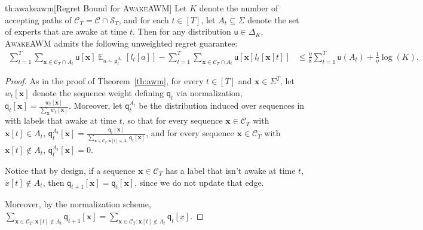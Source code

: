 \documentclass{article}
\DeclareMathOperator*{\E}{\mathbb E}
\newcommand{\sC}{\mathscr C}
\newcommand{\sS}{\mathscr S}
\newcommand{\bx}{{\mathbf x}}
\newcommand{\sfp}{{\mathsf p}}
\newcommand{\sfq}{{\mathsf q}}
\newcommand{\sfu}{{\mathsf u}}
\begin{document}
\begin{reptheorem}{th:awakeawm}[Regret Bound for \textsc{AwakeAWM}]
  Let $K$ denote the number of accepting paths of $\sC_T = \sC \cap \sS_T$,
  and for each $t \in [T]$, let $A_t\subseteq \Sigma$ denote the set of experts 
  that are awake at time $t$.
  Then for any distribution $\sfu\in \Delta_K$, \textsc{AwakeAWM} admits
  the following unweighted regret guarantee:
  \begin{align*}
    \sum_{t = 1}^T \sum_{\bx \in \sC_T \cap A_t} \sfu[\bx] \E_{a \sim \sfp_t^{A_t}} [l_t[a]] - 
    \sum_{t=1}^T \sum_{\bx \in \sC_T \cap A_t} \sfu[\bx] l_t[\bx[t]]
    &\leq \frac{\eta}{8} \sum_{t = 1}^T \sfu(A_t) + \frac{1}{\eta} \log(K). 
  \end{align*}
\end{reptheorem}
\begin{proof}
  As in the proof of Theorem~\ref{th:awm}, for every $t \in [T]$ and 
  $\bx \in \Sigma^T$, let $w_t[\bx]$ denote the sequence weight defining
  $\sfq_t$ via normalization, 
  $\sfq_t[\bx] = \frac{w_t[\bx]}{\sum_{\bx} w_t[\bx]}$. Moreover,
  let $\sfq_t^{A_t}$ be the distribution induced over sequences in
  with labels that awake at time $t$, so that for every sequence $\bx \in \sC_T$
  with $\bx[t] \in A_t$, 
  $\sfq_t^{A_t}[\bx] = \frac{\sfq_t[\bx]}{\sum_{\bx \in \sC_T \colon \bx[t] \in A_t}\sfq_t[\bx]}$,
  and for every sequence $\bx \in \sC_T$ with $\bx[t] \notin A_t$, $\sfq_t^{A_t}[\bx] = 0$.
  
  Notice that by design, if a sequence $\bx \in \sC_T$ has a label that isn't 
  awake at time $t$,  $x[t] \notin A_t$, then $\sfq_{t+1}[\bx] = \sfq_t[\bx]$,
  since we do not update that edge.

  Moreover, by the normalization scheme, 
  $\sum_{\bx \in \sC_T \colon \bx[t] \notin A_t} \sfq_{t+1}[\bx] = \sum_{\bx \in \sC_T \colon \bx[t] \notin A_t} \sfq_t[x]$.


\end{proof}
\end{document}
